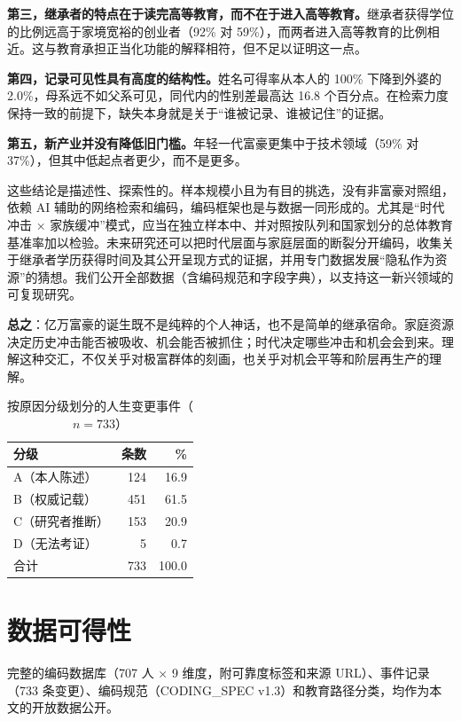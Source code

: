 \documentclass[UTF8,a4paper,11pt]{ctexart}
\begin{document}
\textbf{第三，继承者的特点在于读完高等教育，而不在于进入高等教育。}继承者获得学位的比例远高于家境宽裕的创业者（92\% 对 59\%），而两者进入高等教育的比例相近。这与教育承担正当化功能的解释相符，但不足以证明这一点。

\textbf{第四，记录可见性具有高度的结构性。}姓名可得率从本人的 100\% 下降到外婆的 2.0\%，母系远不如父系可见，同代内的性别差最高达 16.8 个百分点。在检索力度保持一致的前提下，缺失本身就是关于“谁被记录、谁被记住”的证据。

\textbf{第五，新产业并没有降低旧门槛。}年轻一代富豪更集中于技术领域（59\% 对 37\%），但其中低起点者更少，而不是更多。

这些结论是描述性、探索性的。样本规模小且为有目的挑选，没有非富豪对照组，依赖 AI 辅助的网络检索和编码，编码框架也是与数据一同形成的。尤其是“时代冲击 × 家族缓冲”模式，应当在独立样本中、并对照按队列和国家划分的总体教育基准率加以检验。未来研究还可以把时代层面与家庭层面的断裂分开编码，收集关于继承者学历获得时间及其公开呈现方式的证据，并用专门数据发展“隐私作为资源”的猜想。我们公开全部数据（含编码规范和字段字典），以支持这一新兴领域的可复现研究。

\textbf{总之}：亿万富豪的诞生既不是纯粹的个人神话，也不是简单的继承宿命。家庭资源决定历史冲击能否被吸收、机会能否被抓住；时代决定哪些冲击和机会会到来。理解这种交汇，不仅关乎对极富群体的刻画，也关乎对机会平等和阶层再生产的理解。

\begin{table}[htbp]
\centering
\caption{按原因分级划分的人生变更事件（$n=733$）}
\label{tab:events}
\small
\begin{tabular}{lrr}
\toprule
分级 & 条数 & \% \\
\midrule
A（本人陈述） & 124 & 16.9 \\
B（权威记载） & 451 & 61.5 \\
C（研究者推断） & 153 & 20.9 \\
D（无法考证） & 5 & 0.7 \\
\midrule
合计 & 733 & 100.0 \\
\bottomrule
\end{tabular}
\end{table}

\section*{数据可得性}
完整的编码数据库（707 人 × 9 维度，附可靠度标签和来源 URL）、事件记录（733 条变更）、编码规范（CODING\_SPEC v1.3）和教育路径分类，均作为本文的开放数据公开。
\end{document}
